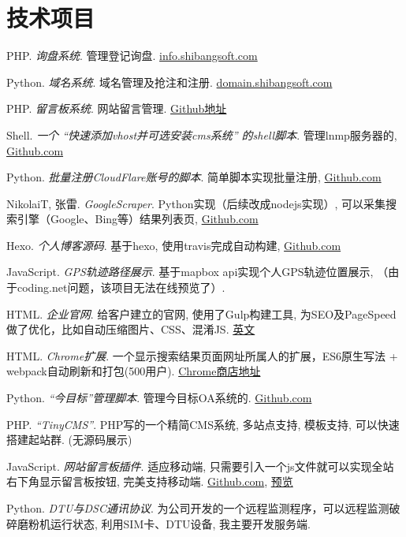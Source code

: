 \section{\textbf{技术项目}}
 \resumeSubHeadingListStart
   \item{
       PHP.
       \emph{询盘系统}.
       管理登记询盘. \href{http://info.shibangsoft.com}{info.shibangsoft.com}
   }
   \item{
       Python.
       \emph{域名系统}.
       域名管理及抢注和注册. \href{http://domain.shibangsoft.com}{domain.shibangsoft.com}
   }
   \item{
       PHP.
       \emph{留言板系统}.
       网站留言管理.  \href{https://github.com/leadscloud/inquiry}{Github地址}
   }
   \item{
       Shell.
       \emph{一个 ``快速添加vhost并可选安装cms系统'' 的shell脚本}.
       管理lnmp服务器的, \href{https://github.com/leadscloud/Tools}{Github.com}
   }
   \item{
       Python.
       \emph{批量注册CloudFlare账号的脚本}.
       简单脚本实现批量注册, \href{https://github.com/leadscloud/cloudflare}{Github.com}
   }
   \item{
       NikolaiT, 张雷.
       \emph{GoogleScraper}.
       Python实现（后续改成nodejs实现）, 可以采集搜索引擎（Google、Bing等）结果列表页, \href{https://github.com/NikolaiT/GoogleScraper/blob/master/AUTHORS}{Github.com}
   }
   \item{
       Hexo.
       \emph{个人博客源码}.
       基于hexo, 使用travis完成自动构建, \href{https://github.com/leadscloud/leadscloud.github.io/tree/source}{Github.com}
   }
   \item{
       JavaScript.
       \emph{GPS轨迹路径展示}.
       基于mapbox api实现个人GPS轨迹位置展示, （由于coding.net问题，该项目无法在线预览了）. %
   }
   \item{
       HTML.
       \emph{企业官网}.
       给客户建立的官网, 使用了Gulp构建工具, 为SEO及PageSpeed做了优化，比如自动压缩图片、CSS、混淆JS. \href{https://www.kamychina.com/}{英文}
   }
   \item{
       HTML.
       \emph{Chrome扩展}.
       一个显示搜索结果页面网址所属人的扩展，ES6原生写法 + webpack自动刷新和打包(500用户). \href{https://chrome.google.com/webstore/detail/ifbiiojnbgljbjffmacihhdkeomdkifc}{Chrome商店地址}
   }
   \item{
       Python.
       \emph{``今目标''管理脚本}.
       管理今目标OA系统的. \href{https://github.com/leadscloud/Jingoal}{Github.com}
   }
   \item{
       PHP.
       \emph{``TinyCMS''}.
       PHP写的一个精简CMS系统, 多站点支持, 模板支持, 可以快速搭建起站群. (无源码展示)
   }
   \item{
       JavaScript.
       \emph{网站留言板插件}.
       适应移动端, 只需要引入一个js文件就可以实现全站右下角显示留言板按钮, 完美支持移动端. \href{https://github.com/leadscloud/leadscloud.github.io/tree/master/livechat}{Github.com},
       \href{https://cdn.livechatinc.xyz/}{预览}
   }
   \item{
       Python.
       \emph{DTU与DSC通讯协议}.
       为公司开发的一个远程监测程序，可以远程监测破碎磨粉机运行状态, 利用SIM卡、DTU设备, 我主要开发服务端.
   }

 \resumeSubHeadingListEnd
